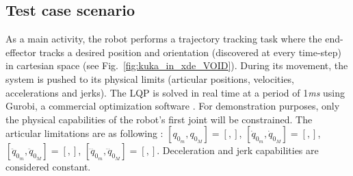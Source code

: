 \documentclass[a4paper, 10pt, conference]{ieeeconf}      %
\begin{document}
{{\subsection{Test case scenario}
As a main activity, the robot performs a trajectory tracking task where the end-effector tracks a desired position and orientation (discovered at every time-step) in cartesian space (see Fig.~\ref{fig:kuka_in_xde_VOID}). During its movement, the system is pushed to its physical limits (articular positions, velocities, accelerations and jerks). The LQP is solved in real time at a period of 1\textit{ms} using Gurobi, a commercial optimization software \cite{gurobi}. For demonstration purposes, only the physical capabilities of the robot's first joint will be constrained. The articular limitations are as following : 
$[q_{0_{m}}, q_{0_{M}}]=[,]$, $[\dot{q}_{0_{m}}, \dot{q}_{0_{M}}]=[,]$, $[\ddot{q}_{0_{m}}, \ddot{q}_{0_{M}}]=[,]$, $[\dddot{q}_{0_{m}}, \dddot{q}_{0_{M}}]=[,]$. Deceleration and jerk capabilities are considered constant. 

}}
\end{document}
